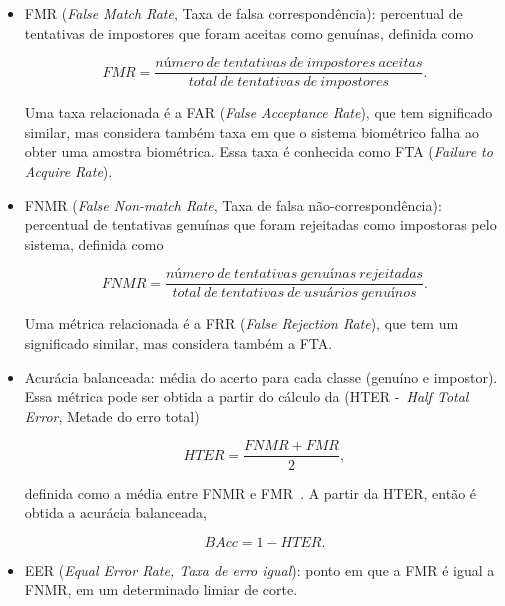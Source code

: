 \begin{itemize}
    \item FMR (\textit{False Match Rate}, Taxa de falsa correspondência): percentual de tentativas de impostores que foram aceitas como genuínas, definida como

        \begin{equation}\label{eqn:fmr}
            FMR = \frac{número\:de\:tentativas\:de\:impostores\:aceitas}{total\:de\:tentativas\:de\:impostores}.
        \end{equation}

        Uma taxa relacionada é a FAR (\textit{False Acceptance Rate}), que tem significado similar, mas considera também taxa em que o sistema biométrico falha ao obter uma amostra biométrica. Essa taxa é conhecida como FTA (\textit{Failure to Acquire Rate}).


    \item FNMR (\textit{False Non-match Rate}, Taxa de falsa não-correspondência): percentual de tentativas genuínas que foram rejeitadas como impostoras pelo sistema, definida como

        \begin{equation}\label{eqn:fnmr}
            FNMR = \frac{número\:de\:tentativas\:genuínas\:rejeitadas}{total\:de\:tentativas\:de\:usuários\:genuínos}.
        \end{equation}

        Uma métrica relacionada é a FRR (\textit{False Rejection Rate}), que tem um significado similar, mas considera também a FTA.

    \item Acurácia balanceada: média do acerto para cada classe (genuíno e impostor). Essa métrica pode ser obtida a partir do cálculo da (HTER -~\textit{Half Total Error}, Metade do erro total)
          
        \begin{equation}\label{eqn:hter}
            HTER = \frac{FNMR + FMR}{2},
        \end{equation}

        definida como a média entre FNMR e FMR~\cite{Roy2022systematic}. A partir da HTER, então é obtida a acurácia balanceada,

        \begin{equation}\label{eqn:bacc}
            BAcc = 1 - HTER.
        \end{equation}
    
    \item EER (\textit{Equal Error Rate, Taxa de erro igual}): ponto em que a FMR é igual a FNMR, em um determinado limiar de corte. 

\end{itemize}


